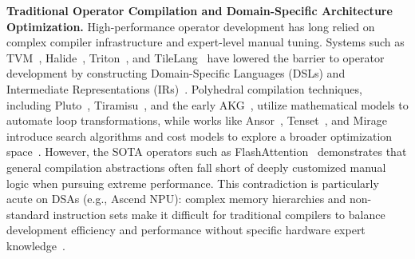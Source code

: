 \documentclass{article}
\theoremstyle{plain}
\theoremstyle{definition}
\theoremstyle{remark}
\begin{document}
\noindent\textbf{Traditional Operator Compilation and Domain-Specific Architecture Optimization.}
High-performance operator development has long relied on complex compiler infrastructure and expert-level manual tuning. Systems such as TVM~\cite{chen2018tvm}, Halide~\cite{ragan2013halide}, Triton~\cite{tillet2019triton}, and TileLang~\cite{wang2025tilelang} have lowered the barrier to operator development by constructing Domain-Specific Languages (DSLs) and Intermediate Representations (IRs)~\cite{li2020deep}. Polyhedral compilation techniques, including Pluto~\cite{bondhugula2008pluto}, Tiramisu~\cite{baghdadi2019tiramisu}, and the early AKG~\cite{zhao2021akg}, utilize mathematical models to automate loop transformations, while works like Ansor~\cite{zheng2020ansor}, Tenset~\cite{zheng2021tenset}, and Mirage~\cite{wu2025mirage} introduce search algorithms and cost models to explore a broader optimization space~\cite{zhai2023tlp,zhu2020daydream}. 
However, the SOTA operators such as FlashAttention~\cite{dao2022flashattention,shah2024flashattention} demonstrates that general compilation abstractions often fall short of deeply customized manual logic when pursuing extreme performance. 
This contradiction is particularly acute on DSAs (e.g., Ascend NPU): complex memory hierarchies and non-standard instruction sets make it difficult for traditional compilers to balance development efficiency and performance without specific hardware expert knowledge~\cite{zhou2025squeezing,ai2025neutronascend}.
\end{document}
